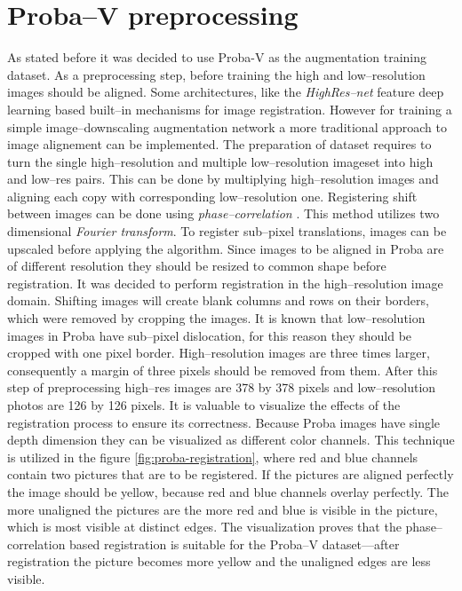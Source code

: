 \section{Proba--V preprocessing}
As stated before it was decided to use Proba-V as the augmentation training dataset.
As a preprocessing step, before training the high and low--resolution images should be aligned.
Some architectures, like the \textit{HighRes--net} feature deep learning based built--in mechanisms for image registration.
However for training a simple image--downscaling augmentation network a more traditional approach to image alignement can be implemented.
The preparation of dataset requires to turn the single high--resolution and multiple low--resolution imageset into high and low--res pairs.
This can be done by multiplying high--resolution images and aligning each copy with corresponding low--resolution one.
Registering shift between images can be done using \textit{phase--correlation} \cite{guizar-2008-registration}.
This method utilizes two dimensional \textit{Fourier transform}.
To register sub--pixel translations, images can be upscaled before applying the algorithm.
Since images to be aligned in Proba are of different resolution they should be resized to common shape before registration.
It was decided to perform registration in the high--resolution image domain.
Shifting images will create blank columns and rows on their borders, which were removed by cropping the images.
It is known that low--resolution images in Proba have sub--pixel dislocation, for this reason they should be cropped with one pixel border.
High--resolution images are three times larger, consequently a margin of three pixels should be removed from them.
After this step of preprocessing high--res images are 378 by 378 pixels and low--resolution photos are 126 by 126 pixels.
It is valuable to visualize the effects of the registration process to ensure its correctness.
Because Proba images have single depth dimension they can be visualized as different color channels.
This technique is utilized in the figure \ref{fig:proba-registration}, where red and blue channels contain two pictures that are to be registered.
If the pictures are aligned perfectly the image should be yellow, because red and blue channels overlay perfectly.
The more unaligned the pictures are the more red and blue is visible in the picture, which is most visible at distinct edges.
The visualization proves that the phase--correlation based registration is suitable for the Proba--V dataset---after registration the picture becomes more yellow and the unaligned edges are less visible.
